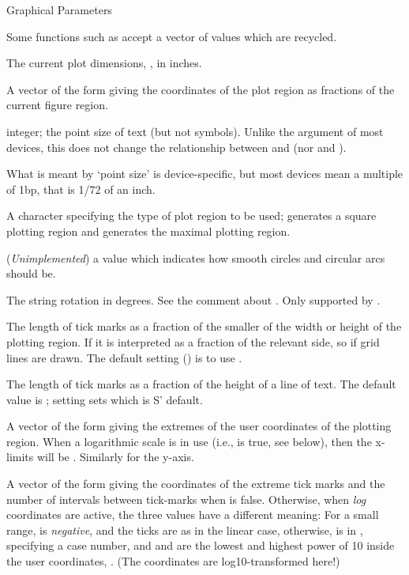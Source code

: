 \begin{Section}{Graphical Parameters}
\begin{description}
Some functions such as  accept a vector of values
which are recycled.

\item[\code{pin}] The current plot dimensions, ,
in inches.
\item[\code{plt}] A vector of the form 
giving the coordinates of the plot region as fractions of the
current figure region.
\item[\code{ps}] integer; the point size of text (but not symbols).  Unlike
the  argument of most devices, this does not change
the relationship between  and  (nor 
and ).

What is meant by `point size' is device-specific, but most
devices mean a multiple of 1bp, that is 1/72 of an inch.

\item[\code{pty}] A character specifying the type of plot region to
be used;  generates a square plotting region and
 generates the maximal plotting region.
\item[\code{smo}] (\emph{Unimplemented}) a value which indicates how
smooth circles and circular arcs should be.
\item[\code{srt}] The string rotation in degrees.  See the comment
about .  Only supported by .



\item[\code{tck}] The length of tick marks as a fraction of the
smaller of the width or height of the plotting region.
If  it is interpreted as a fraction of the
relevant side, so if  grid lines are drawn.  The
default setting () is to use .
\item[\code{tcl}] The length of tick marks as a fraction of the
height of a line of text.  The default value is ;
setting  sets  which is S' default.
\item[\code{usr}] A vector of the form 
giving the extremes of the user coordinates of the plotting
region.  When a logarithmic scale is in use (i.e.,
 is true, see below), then the x-limits will be
.  Similarly for the y-axis.

\item[\code{xaxp}] A vector of the form  giving
the coordinates of the extreme tick marks and the number of
intervals between tick-marks when  is false.
Otherwise, when \emph{log} coordinates are active, the three
values have a different meaning: For a small range,  is
\emph{negative}, and the ticks are as in the linear case,
otherwise,  is in , specifying a case number,
and  and  are the lowest and highest power of 10
inside the user coordinates, . (The
 coordinates are log10-transformed here!)


\end{description}
\end{Section}
